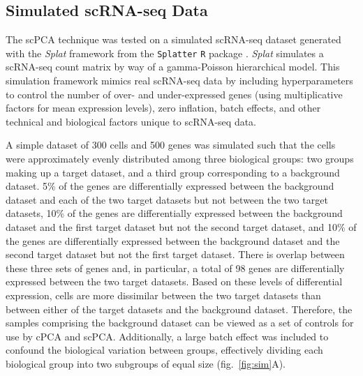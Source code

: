 
\subsection{Simulated scRNA-seq Data}\label{sim_scRNA-seq}

The scPCA technique was tested on a simulated scRNA-seq dataset generated with the \textit{Splat} framework from the \texttt{Splatter} \texttt{R} package  \cite{Zappia2017}. \textit{Splat} simulates a scRNA-seq count matrix by way of a gamma-Poisson hierarchical model. This simulation framework mimics real scRNA-seq data by including hyperparameters to control the number of over- and under-expressed genes (using multiplicative factors for mean expression levels), zero inflation, batch effects, and other technical and biological factors unique to scRNA-seq data.

A simple dataset of 300 cells and 500 genes was simulated such that the cells were approximately evenly distributed among three biological groups: two groups making up a target dataset, and a third group corresponding to a background dataset. 5\% of the genes are differentially expressed between the background dataset and each of the two target datasets but not between the two target datasets, 10\% of the genes are differentially expressed between the background dataset and the first target dataset but not the second target dataset, and 10\% of the genes are differentially expressed between the background dataset and the second target dataset but not the first target dataset. There is overlap between these three sets of genes and, in particular, a total of 98 genes are differentially expressed between the two target datasets. Based on these levels of differential expression, cells are more dissimilar between the two target datasets than between either of the target datasets and the background dataset. Therefore, the samples comprising the background dataset can be viewed as a set of controls for use by cPCA and scPCA. Additionally, a large batch effect was included to confound the biological variation between groups, effectively dividing each biological group into two subgroups of equal size (fig.~\ref{fig:sim}A).

